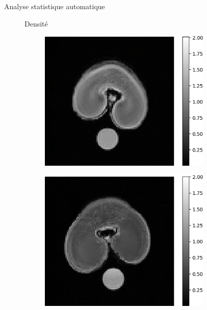 \documentclass[10pt]{beamer}
\begin{document}
\begin{frame}{Analyse statistique automatique}

  \begin{figure}
    \centering
    Densité
    \begin{subfigure}[c]{0.33\textwidth}
      \centering
      \includegraphics[width=0.9\textwidth]{fig/manualcorr_irm250_density.png}
      \caption{}
      \label{subfig:manualcorr_irm250_t2.png}
    \end{subfigure}%
    \begin{subfigure}[c]{0.33\textwidth}
      \centering
      \includegraphics[width=0.9\textwidth]{fig/manualcorr_irm650_density}
      \caption{}
      \label{subfig:manualcorr_irm650_t2}
    \end{subfigure}

\end{figure}
\end{frame}
\end{document}
